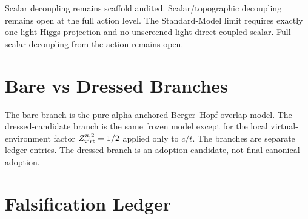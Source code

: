 \documentclass[11pt]{article}
\begin{document}
Scalar decoupling remains scaffold audited. Scalar/topographic decoupling remains open
at the full action level. The Standard-Model limit requires exactly one light
Higgs projection and no unscreened light direct-coupled scalar. Full scalar
decoupling from the action remains open.

\section{Bare vs Dressed Branches}

The bare branch is the pure alpha-anchored Berger--Hopf overlap model. The
dressed-candidate branch is the same frozen model except for the local
virtual-environment factor $Z_{\rm virt}^{u,2}=1/2$ applied only to $c/t$. The
branches are separate ledger entries. The dressed branch is an adoption
candidate, not final canonical adoption.

\section{Falsification Ledger}
\end{document}
